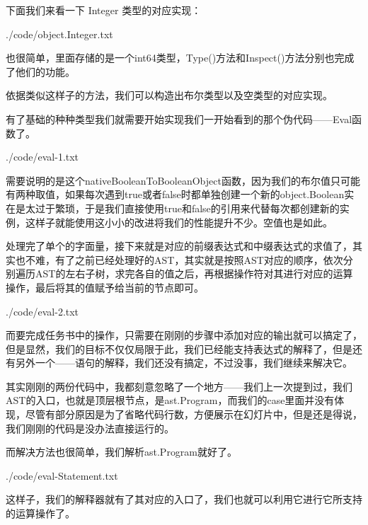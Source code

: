 \documentclass{beamer}
\begin{document}
	\begin{frame}
		下面我们来看一下 Integer 类型的对应实现：
		
		
		{./code/object.Integer.txt}
		
		也很简单，里面存储的是一个int64类型，Type()方法和Inspect()方法分别也完成了他们的功能。
		
		依据类似这样子的方法，我们可以构造出布尔类型以及空类型的对应实现。
	\end{frame}
	\begin{frame}
		有了基础的种种类型我们就需要开始实现我们一开始看到的那个伪代码——Eval函数了。
		
		
		{./code/eval-1.txt}
		
		需要说明的是这个nativeBooleanToBooleanObject函数，因为我们的布尔值只可能有两种取值，如果每次遇到true或者false时都单独创建一个新的object.Boolean实在是太过于繁琐，于是我们直接使用true和false的引用来代替每次都创建新的实例，这样子就能使用这小小的改进将我们的性能提升不少。空值也是如此。
	\end{frame}
	\begin{frame}
		处理完了单个的字面量，接下来就是对应的前缀表达式和中缀表达式的求值了，其实也不难，有了之前已经处理好的AST，其实就是按照AST对应的顺序，依次分别遍历AST的左右子树，求完各自的值之后，再根据操作符对其进行对应的运算操作，最后将其的值赋予给当前的节点即可。
		
		
		{./code/eval-2.txt}
	\end{frame}
	\begin{frame}
		而要完成任务书中的操作，只需要在刚刚的步骤中添加对应的输出就可以搞定了，但是显然，我们的目标不仅仅局限于此，我们已经能支持表达式的解释了，但是还有另外一个——语句的解释，我们还没有搞定，不过没事，我们继续来解决它。
		
		其实刚刚的两份代码中，我都刻意忽略了一个地方——我们上一次提到过，我们AST的入口，也就是顶层根节点，是ast.Program，而我们的case里面并没有体现，尽管有部分原因是为了省略代码行数，方便展示在幻灯片中，但是还是得说，我们刚刚的代码是没办法直接运行的。
	\end{frame}
	\begin{frame}
		而解决方法也很简单，我们解析ast.Program就好了。
		
		{./code/eval-Statement.txt}
	\end{frame}
	\begin{frame}
		这样子，我们的解释器就有了其对应的入口了，我们也就可以利用它进行它所支持的运算操作了。
	\end{frame}
\end{document}
